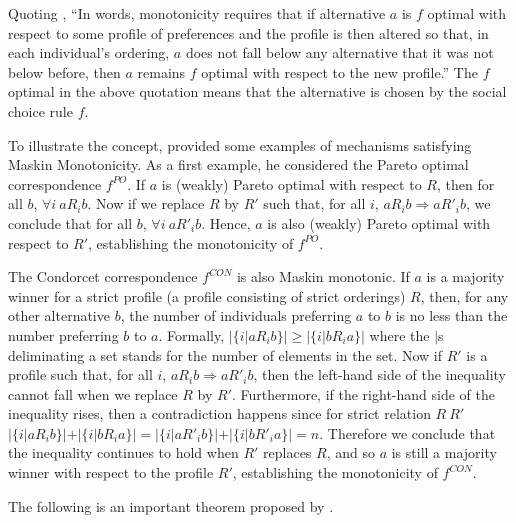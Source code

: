 Quoting \parencite{Maskin1999}, ``In words, monotonicity requires that if alternative $a$ is $f$ optimal with respect to some
profile of preferences and the profile is then altered so that, in each individual’s ordering,
$a$ does not fall below any alternative that it was not below before, then $a$ remains $f$ 
optimal with respect to the new profile.'' The $f$ optimal in the above quotation means that the alternative is chosen by the social choice rule $f$.

To illustrate the concept, \parencite{Maskin1999} provided some examples of
mechanisms satisfying Maskin Monotonicity. As a first example, he considered the Pareto optimal correspondence $f^{PO}$. 
If $a$ is (weakly) Pareto optimal with respect to $R$, then for all $b$,  $\forall i \ a R_i b$. Now if we replace $R$ by $R'$ such that, for all $i$, $a R_i b \Rightarrow  a R'_i b$, we conclude that
for all $b$, $\forall i \ a R'_i b$. Hence, $a$ is also (weakly) Pareto optimal with respect to $R'$,  establishing the monotonicity of $f^{PO}$.

The Condorcet correspondence $f^{CON}$ is also Maskin monotonic. If $a$ is a majority winner
for a strict profile (a profile consisting of strict orderings) $R$, then, for any other alternative
$b$, the number of individuals preferring $a$ to $b$ is no less than the number preferring $b$ to
$a$. Formally, 
$ |\{i|a R_i b\}| \geq |\{i|b R_i a\}| $ where the $|$s deliminating a set stands for the number of elements in the set.
Now if $R'$ is a profile such that, for all $i$, $a R_i b \Rightarrow a R'_i b$, then the left-hand side of the inequality cannot
fall when we replace $R$ by $R'$. Furthermore, if the right-hand side of the inequality rises, then a contradiction happens since for strict relation 
$R\ R'$ $|\{i|a R_i b\}| + |\{i|b R_i a\}|= |\{i|a R'_i b\}| + |\{i|b R'_i a\}|= n $. Therefore we conclude that the inequality continues to hold when $R'$ replaces $R$, and
so $a$ is still a majority winner with respect to the profile $R'$, establishing the monotonicity of $f^{CON}$.


The following  is an important theorem proposed by \parencite{Maskin1999}.


